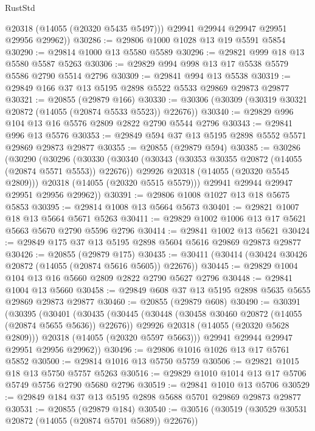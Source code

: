 \begin{lexlean}{RustStd}
\begin{coremodule}
          @20318
          (@14055 (@20320 @5435 @5497)))
        @29941
        @29944
        @29947
        @29951
        @29956
        @29962))
@30286 := @29806 @1000 @1028 @13 @19 @5591 @5854
@30290 := @29814 @1000 @13 @5580 @5589
@30296 := @29821 @999 @18 @13 @5580 @5587 @5263
@30306 := @29829 @994 @998 @13 @17 @5538 @5579 @5586 @2790 @5514 @2796
@30309 := @29841 @994 @13 @5538
@30319 := @29849 @166 @37 @13 @5195 @2898 @5522 @5533 @29869 @29873 @29877
@30321 := @20855 (@29879 @166)
@30330 := @30306 (@30309 (@30319 @30321 @20872 (@14055 (@20874 @5533 @5523)) @22676))
@30340 := @29829 @996 @104 @13 @16 @5576 @2809 @2822 @2790 @5544 @2796
@30343 := @29841 @996 @13 @5576
@30353 := @29849 @594 @37 @13 @5195 @2898 @5552 @5571 @29869 @29873 @29877
@30355 := @20855 (@29879 @594)
@30385 := @30286
    (@30290
      (@30296
        (@30330
          (@30340
            (@30343 (@30353 @30355 @20872 (@14055 (@20874 @5571 @5553)) @22676))
            @29926
            @20318
            (@14055 (@20320 @5545 @2809)))
          @20318
          (@14055 (@20320 @5515 @5579)))
        @29941
        @29944
        @29947
        @29951
        @29956
        @29962))
@30391 := @29806 @1008 @1027 @13 @18 @5675 @5853
@30395 := @29814 @1008 @13 @5664 @5673
@30401 := @29821 @1007 @18 @13 @5664 @5671 @5263
@30411 := @29829 @1002 @1006 @13 @17 @5621 @5663 @5670 @2790 @5596 @2796
@30414 := @29841 @1002 @13 @5621
@30424 := @29849 @175 @37 @13 @5195 @2898 @5604 @5616 @29869 @29873 @29877
@30426 := @20855 (@29879 @175)
@30435 := @30411 (@30414 (@30424 @30426 @20872 (@14055 (@20874 @5616 @5605)) @22676))
@30445 := @29829 @1004 @104 @13 @16 @5660 @2809 @2822 @2790 @5627 @2796
@30448 := @29841 @1004 @13 @5660
@30458 := @29849 @608 @37 @13 @5195 @2898 @5635 @5655 @29869 @29873 @29877
@30460 := @20855 (@29879 @608)
@30490 := @30391
    (@30395
      (@30401
        (@30435
          (@30445
            (@30448 (@30458 @30460 @20872 (@14055 (@20874 @5655 @5636)) @22676))
            @29926
            @20318
            (@14055 (@20320 @5628 @2809)))
          @20318
          (@14055 (@20320 @5597 @5663)))
        @29941
        @29944
        @29947
        @29951
        @29956
        @29962))
@30496 := @29806 @1016 @1026 @13 @17 @5761 @5852
@30500 := @29814 @1016 @13 @5750 @5759
@30506 := @29821 @1015 @18 @13 @5750 @5757 @5263
@30516 := @29829 @1010 @1014 @13 @17 @5706 @5749 @5756 @2790 @5680 @2796
@30519 := @29841 @1010 @13 @5706
@30529 := @29849 @184 @37 @13 @5195 @2898 @5688 @5701 @29869 @29873 @29877
@30531 := @20855 (@29879 @184)
@30540 := @30516 (@30519 (@30529 @30531 @20872 (@14055 (@20874 @5701 @5689)) @22676))

\end{coremodule}
\end{lexlean}
